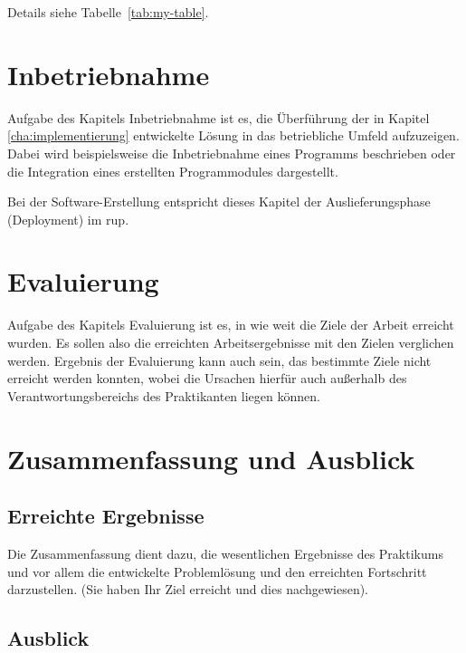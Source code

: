 \documentclass[oneside]{ausarbeitung}
\begin{document}
Details siehe Tabelle~\ref{tab:my-table}.

\chapter{Inbetriebnahme}
\label{cha:inbetriebnahme}

Aufgabe des Kapitels Inbetriebnahme ist es, die Überführung der in 
Kapitel \ref{cha:implementierung} entwickelte Lösung in das betriebliche 
Umfeld aufzuzeigen. Dabei wird beispielsweise die Inbetriebnahme eines 
Programms beschrieben oder die Integration eines erstellten 
Programmodules dargestellt.

Bei der Software-Erstellung entspricht dieses Kapitel der 
Auslieferungsphase (Deployment) im \ac{rup}.

\chapter{Evaluierung}

Aufgabe des Kapitels Evaluierung ist es, in wie weit die Ziele der 
Arbeit erreicht wurden. Es sollen also die erreichten Arbeitsergebnisse 
mit den Zielen verglichen werden. Ergebnis der Evaluierung kann auch 
sein, das bestimmte Ziele nicht erreicht werden konnten, wobei die 
Ursachen hierfür auch außerhalb des Verantwortungsbereichs des 
Praktikanten liegen können.

\chapter{Zusammenfassung und Ausblick}
\label{cha:zusammenfassung}

\section{Erreichte Ergebnisse}
\label{sec:ergebnisse}

Die Zusammenfassung dient dazu, die wesentlichen Ergebnisse des 
Praktikums und vor allem die entwickelte Problemlösung und den 
erreichten Fortschritt darzustellen. (Sie haben Ihr Ziel erreicht und 
dies nachgewiesen).

\section{Ausblick}
\label{sec:ausblick}
\end{document}
